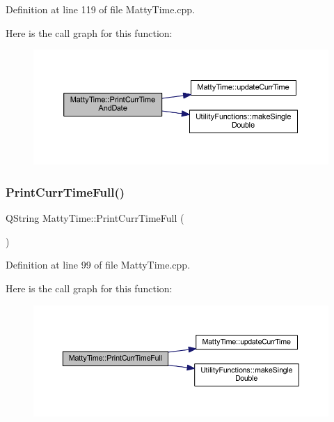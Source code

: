 Definition at line 119 of file Matty\+Time.\+cpp.

Here is the call graph for this function\+:
\nopagebreak
\begin{figure}[H]
\begin{center}
\leavevmode
\includegraphics[width=350pt]{classMattyTime_a96805256f90a469aa22824a1e2dd219d_cgraph}
\end{center}
\end{figure}
\hypertarget{classMattyTime_a9d3500ad88197ee8e2db9f36aec1a266}{}\label{classMattyTime_a9d3500ad88197ee8e2db9f36aec1a266} 
\subsubsection{\texorpdfstring{Print\+Curr\+Time\+Full()}{PrintCurrTimeFull()}}
{\footnotesize\ttfamily Q\+String Matty\+Time\+::\+Print\+Curr\+Time\+Full (\begin{DoxyParamCaption}{ }\end{DoxyParamCaption})\hspace{0.3cm}{\ttfamily [static]}}



Definition at line 99 of file Matty\+Time.\+cpp.

Here is the call graph for this function\+:
\nopagebreak
\begin{figure}[H]
\begin{center}
\leavevmode
\includegraphics[width=350pt]{classMattyTime_a9d3500ad88197ee8e2db9f36aec1a266_cgraph}
\end{center}
\end{figure}
\hypertarget{classMattyTime_a82a6b06fa496b4d0f9b8d6e11d5b03c8}{}\label{classMattyTime_a82a6b06fa496b4d0f9b8d6e11d5b03c8} 
